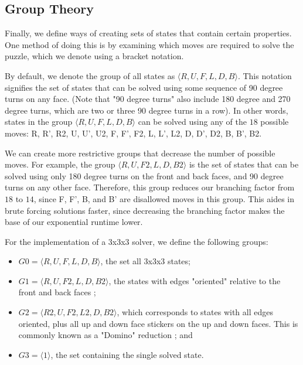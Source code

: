 \documentclass{article}
\begin{document}
\subsection{Group Theory}

Finally, we define ways of creating sets of states that contain certain properties. One method of doing this is by examining which moves are required to solve the puzzle, which we denote using a bracket notation.

By default, we denote the group of all states as $\langle R, U, F, L, D, B \rangle$. This notation signifies the set of states that can be solved using some sequence of 90 degree turns on any face. (Note that "90 degree turns" also include 180 degree and 270 degree turns, which are two or three 90 degree turns in a row). In other words, states in the group $\langle R, U, F, L, D, B \rangle$ can be solved using any of the $18$ possible moves: R, R', R2, U, U', U2, F, F', F2, L, L', L2, D, D', D2, B, B', B2.

We can create more restrictive groups that decrease the number of possible moves. For example, the group $\langle R, U, F2, L, D, B2 \rangle$ is the set of states that can be solved using only 180 degree turns on the front and back faces, and 90 degree turns on any other face. Therefore, this group reduces our branching factor from $18$ to $14$, since F, F', B, and B' are disallowed moves in this group. This aides in brute forcing solutions faster, since decreasing the branching factor makes the base of our exponential runtime lower.


For the implementation of a 3x3x3 solver, we define the following groups:

\begin{itemize}
    \item $G0 = \langle R, U, F, L, D, B \rangle$, the set all 3x3x3 states;
    \item $G1 = \langle R, U, F2, L, D, B2 \rangle$, the states with edges "oriented" relative to the front and back faces \cite{eo};
    \item $G2 = \langle R2, U, F2, L2, D, B2 \rangle$, which corresponds to states with all edges oriented, plus all up and down face stickers on the up and down faces. This is commonly known as a "Domino" reduction \cite{domino}; and 
    \item $G3 = \langle 1 \rangle$, the set containing the single solved state.
\end{itemize}
\end{document}
